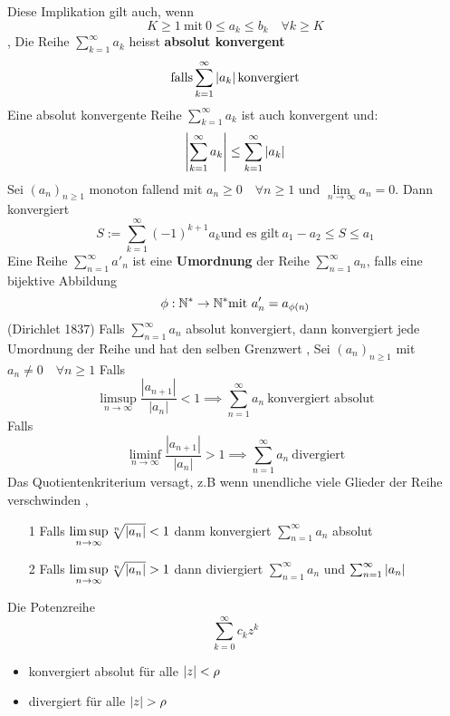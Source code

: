 Diese Implikation gilt auch, wenn \[K \geq 1 \  \text{mit} \ 0 \leq a_k \leq b_k \quad \forall k \geq K\]
\sep
\Def[2.45] Die Reihe \(\sum_{k=1}^{\infty} a_{k}\) heisst \textbf{absolut konvergent}
\[\text{falls} \sum_{k=1}^{\infty} \left\lvert a_{k} \right\rvert \text{konvergiert}\] \newline
\Satz[2.46] Eine absolut konvergente Reihe  \(\sum_{k=1}^{\infty} a_{k}\) ist auch konvergent und:
\[\left\lvert \sum_{k=1}^{\infty} a_{k} \right\rvert \leq \sum_{k=1}^{\infty} \left\lvert a_{k} \right\rvert\] \newline
\Satz[4.8 (Leibniz 1682)] Sei \((a_n)_{n \geq 1}\) monoton fallend mit \(a_n \geq 0 \quad \forall n \geq 1\) und \(\lim\limits_{n \rightarrow \infty} a_n = 0\). Dann konvergiert
\[S := \sum_{k=1}^{\infty} (-1)^{k+1}a_k \text{und es gilt} \  a_1 - a_2 \leq S \leq a_1\]
\Def[2.50] Eine Reihe \(\sum_{n=1}^{\infty} a'_n\) ist eine \textbf{Umordnung} der Reihe \(\sum_{n=1}^{\infty} a_n\), falls eine bijektive Abbildung
\[\phi : \mathbb{N}^{*} \rightarrow \mathbb{N}^{*} \text{mit} \ a'_{n} = a_{\phi(n)}\] \newline
\Satz[2.52](Dirichlet 1837) Falls \(\sum_{n=1}^{\infty} a_n\) absolut konvergiert, dann konvergiert jede Umordnung der Reihe und hat den selben Grenzwert
\sep
\Satz[2.53(Quotientenkriterium] Sei \((a_n)_{n \geq 1}\) mit \(a_n \neq 0 \quad \forall n \geq 1 \) Falls
\[\limsup\limits_{n \rightarrow \infty} \frac{\left|a_{n+1}\right|}{\left|a_{n}\right|}<1 \implies \sum_{n=1}^{\infty} a_{n} \ \text{konvergiert absolut}\]
Falls
\[\liminf\limits_{n \rightarrow \infty} \frac{\left|a_{n+1}\right|}{\left|a_{n}\right|}>1 \implies \sum_{n=1}^{\infty} a_{n} \ \text{divergiert}\]
 Das Quotientenkriterium versagt, z.B wenn unendliche viele Glieder der Reihe verschwinden
\sep
\Satz[2.56 Wurzelkriterium]
\begin{enumerate}
    \item [1] Falls \(\limsup\limits_{n \rightarrow \infty} \sqrt[n]{\left\lvert a_n \right\rvert} < 1\) danm konvergiert \(\sum_{n=1}^{\infty} a_n\) absolut
    \item [2] Falls \(\limsup\limits_{n \rightarrow \infty} \sqrt[n]{\left\lvert a_n \right\rvert} > 1\) dann diviergiert \(\sum_{n=1}^{\infty} a_n\) und \(\sum_{n=1}^{\infty}\left\lvert a_n \right\rvert \)
\end{enumerate}
 Die Potenzreihe \[\sum_{k=0}^{\infty} c_kz^k\]
\begin{itemize}
    \item konvergiert absolut für alle $\left\lvert z \right\rvert < \rho$ 
    \item divergiert für alle $\left\lvert z \right\rvert > \rho$
    \end{itemize}
